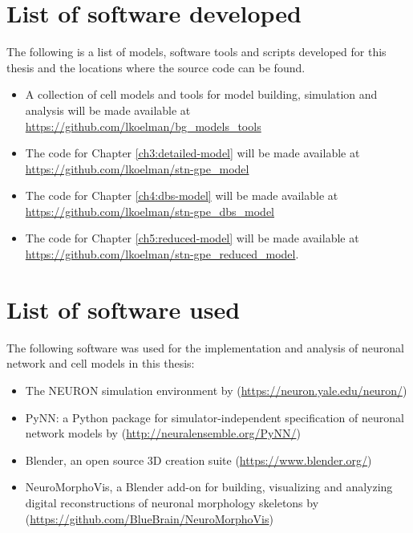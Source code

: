 %
%
%
\section*{List of software developed}
%
%
%

The following is a list of models, software tools and scripts developed for this thesis
and the locations where the source code can be found.

\begin{itemize}
    \item A collection of cell models and tools for model building, simulation and analysis will be made available at \url{https://github.com/lkoelman/bg_models_tools}

    \item The code for Chapter \ref{ch3:detailed-model} will be made available at \url{https://github.com/lkoelman/stn-gpe_model}

    \item The code for Chapter \ref{ch4:dbs-model} will be made available at \url{https://github.com/lkoelman/stn-gpe_dbs_model}

    \item The code for Chapter \ref{ch5:reduced-model} will be made available at \url{https://github.com/lkoelman/stn-gpe_reduced_model}.

\end{itemize}

%
%
%
\section*{List of software used}

The following software was used for the implementation and analysis of neuronal network
and cell models in this thesis:

\begin{itemize}
    \item The NEURON simulation environment by \cite{hines_neuron_1997} (\url{https://neuron.yale.edu/neuron/})
    \item PyNN: a Python package for simulator-independent specification of neuronal network models by \cite{davison_pynn_2008} (\url{http://neuralensemble.org/PyNN/})
    \item Blender, an open source 3D creation suite (\url{https://www.blender.org/})
    \item NeuroMorphoVis, a Blender add-on for building, visualizing and analyzing digital reconstructions of neuronal morphology skeletons by \cite{abdellah_neuromorphovis_2018} (\url{https://github.com/BlueBrain/NeuroMorphoVis})
\end{itemize}